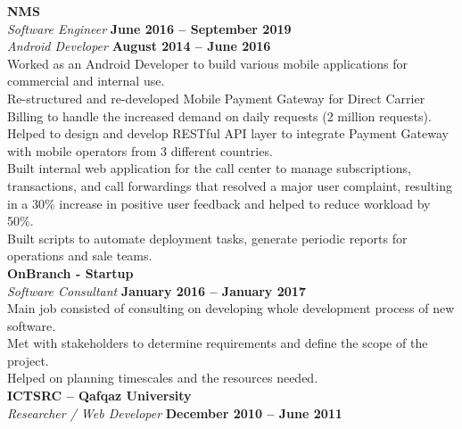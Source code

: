 \documentclass[margin,line]{resume}
\begin{document}
\begin{resume}
    \textbf{\listing NMS} \vspace{2mm}\\\vspace{1mm}%
    \textsl{Software Engineer} \hfill \textbf{June 2016 -- September 2019}\\
    \textsl{Android Developer} \hfill \textbf{August 2014 -- June 2016}\\
    Worked as an Android Developer to build various mobile applications for commercial and internal use.\\ 
Re-structured and re-developed Mobile Payment Gateway for Direct Carrier Billing to handle the increased demand on daily requests (2 million requests).\\
Helped to design and develop RESTful API layer to integrate Payment Gateway with mobile operators from 3 different countries.\\ 
Built internal web application for the call center to manage subscriptions, transactions, and call forwardings that resolved a major user complaint, resulting in a 30\% increase in positive user feedback and helped to reduce workload by 50\%.\\ 
Built scripts to automate deployment tasks, generate periodic reports for operations and sale teams.\\


    \textbf{\listing OnBranch - Startup} \vspace{2mm}\\\vspace{1mm}%
    \textsl{Software Consultant} \hfill \textbf{January 2016 -- January 2017}\\
   Main job consisted of consulting on developing whole development process of new software.\\
Met with stakeholders to determine requirements and define the scope of the project.\\
Helped on planning timescales and the resources needed.\\


    \textbf{\listing ICTSRC – Qafqaz University} \vspace{2mm}\\\vspace{1mm}%
    \textsl{Researcher / Web Developer} \hfill \textbf{December 2010 -- June 2011}

\sectionline


\end{resume}
\end{document}
